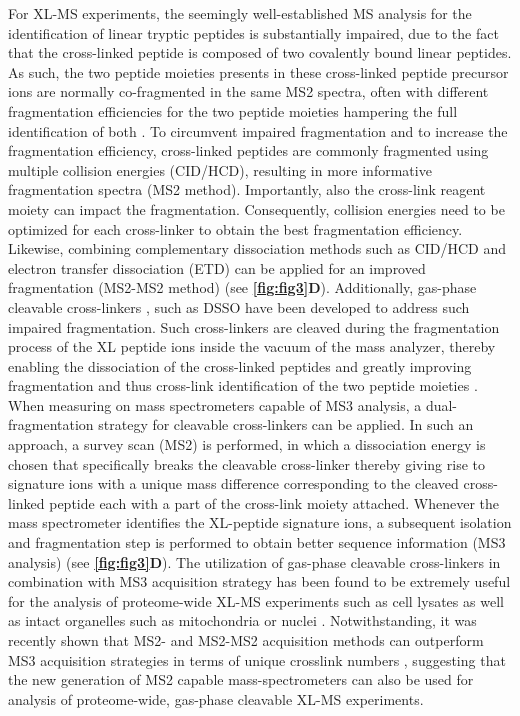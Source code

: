 For XL-MS experiments, the seemingly well-established MS analysis for the identification of linear tryptic peptides is substantially impaired, due to the fact that the cross-linked peptide is composed of two covalently bound linear peptides. As such, the two peptide moieties presents in these cross-linked peptide precursor ions are normally co-fragmented in the same MS2 spectra, often with different fragmentation efficiencies for the two peptide moieties hampering the full identification of both \cite{Liu_2017a}. To circumvent impaired fragmentation and to increase the fragmentation efficiency, cross-linked peptides are commonly fragmented using multiple collision energies (CID/HCD), resulting in more informative fragmentation spectra (MS2 method). Importantly, also the cross-link reagent moiety can impact the fragmentation. Consequently, collision energies need to be optimized for each cross-linker to obtain the best fragmentation efficiency. Likewise, combining complementary dissociation methods such as CID/HCD and electron transfer dissociation (ETD) can be applied for an improved fragmentation (MS2-MS2 method) \cite{Campbell_2009, Frese_2012, Liu_2017b} (see \textbf{\autoref{fig:fig3}D}). Additionally, gas-phase cleavable cross-linkers \cite{Sinz_2017}, such as DSSO have been developed to address such impaired fragmentation. Such cross-linkers are cleaved during the fragmentation process of the XL peptide ions inside the vacuum of the mass analyzer, thereby enabling the dissociation of the cross-linked peptides and greatly improving fragmentation and thus cross-link identification of the two peptide moieties \cite{Liu_2017a}. When measuring on mass spectrometers capable of MS3 analysis, a dual-fragmentation strategy for cleavable cross-linkers can be applied. In such an approach, a survey scan (MS2) is performed, in which a dissociation energy is chosen that specifically breaks the cleavable cross-linker thereby giving rise to signature ions with a unique mass difference corresponding to the cleaved cross-linked peptide each with a part of the cross-link moiety attached. Whenever the mass spectrometer identifies the XL-peptide signature ions, a subsequent isolation and fragmentation step is performed to obtain better sequence information (MS3 analysis) \cite{Liu_2017a, Sinz_2017} (see \textbf{\autoref{fig:fig3}D}). The utilization of gas-phase cleavable cross-linkers in combination with MS3 acquisition strategy has been found to be extremely useful for the analysis of proteome-wide XL-MS experiments such as cell lysates \cite{Klykov_2018, Liu_2017a} as well as intact organelles such as mitochondria \cite{Liu_2018} or nuclei \cite{Fasci_2018}. Notwithstanding, it was recently shown that MS2- and MS2-MS2 acquisition methods can outperform MS3 acquisition strategies in terms of unique crosslink numbers \cite{Matzinger_2022}, suggesting that the new generation of MS2 capable mass-spectrometers can also be used for analysis of proteome-wide, gas-phase cleavable XL-MS experiments.
%
